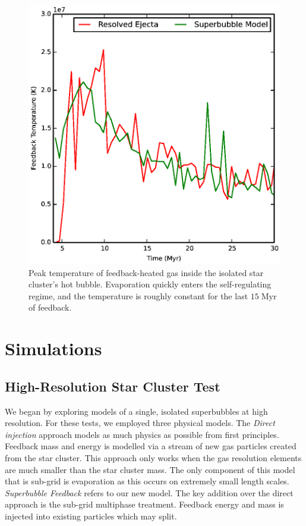 \begin{figure}
    \includegraphics[width=\textwidth]{figures1/onestar_hottemp.eps}
    \caption[Peak temperature of feedback-heated gas in a superbubble]{Peak
    temperature of feedback-heated gas inside the isolated star cluster's hot
    bubble.  Evaporation quickly enters the self-regulating regime, and the
    temperature is roughly constant for the last $15\;\mathrm{Myr}$ of
    feedback.}
    \label{onestar_hottemp}
\end{figure}


\section{Simulations}
\subsection{High-Resolution Star Cluster Test}\label{cluster}
We began by exploring models of a single, isolated superbubbles at high
resolution.  For these tests, we employed three physical models.  The {\it
Direct injection} approach models as much physics as possible from first
principles.  Feedback mass and energy is modelled via a stream of new gas
particles created from the star cluster.  This approach only works when the gas
resolution elements are much smaller than the star cluster mass.  The only
component of this model that is sub-grid is evaporation as this occurs on
extremely small length scales.  {\it Superbubble Feedback} refers to our new
model.  The key addition over the direct approach is the sub-grid multiphase
treatment.  Feedback energy and mass is injected into existing particles which
may split.  

